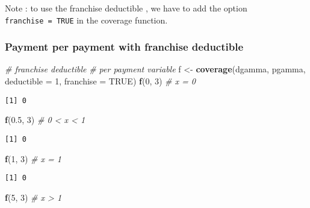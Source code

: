 \documentclass[]{book}
\newenvironment{Shaded}{\begin{snugshade}}{\end{snugshade}}
\newcommand{\KeywordTok}[1]{\textcolor[rgb]{0.13,0.29,0.53}{\textbf{#1}}}
\newcommand{\DataTypeTok}[1]{\textcolor[rgb]{0.13,0.29,0.53}{#1}}
\newcommand{\DecValTok}[1]{\textcolor[rgb]{0.00,0.00,0.81}{#1}}
\newcommand{\FloatTok}[1]{\textcolor[rgb]{0.00,0.00,0.81}{#1}}
\newcommand{\StringTok}[1]{\textcolor[rgb]{0.31,0.60,0.02}{#1}}
\newcommand{\CommentTok}[1]{\textcolor[rgb]{0.56,0.35,0.01}{\textit{#1}}}
\newcommand{\OtherTok}[1]{\textcolor[rgb]{0.56,0.35,0.01}{#1}}
\newcommand{\NormalTok}[1]{#1}
\theoremstyle{definition}
\theoremstyle{definition}
\theoremstyle{definition}
\theoremstyle{remark}
\begin{document}
Note : to use the franchise deductible , we have to add the option
\texttt{franchise\ =\ TRUE} in the coverage function.

\subsubsection{Payment per payment with franchise
deductible}\label{payment-per-payment-with-franchise-deductible}

\begin{Shaded}
\begin{Highlighting}[]
\CommentTok{# franchise deductible}
\CommentTok{# per payment variable}
\NormalTok{f <-}\StringTok{ }\KeywordTok{coverage}\NormalTok{(dgamma, pgamma, }\DataTypeTok{deductible =} \DecValTok{1}\NormalTok{, }\DataTypeTok{franchise =} \OtherTok{TRUE}\NormalTok{)}
\KeywordTok{f}\NormalTok{(}\DecValTok{0}\NormalTok{, }\DecValTok{3}\NormalTok{)   }\CommentTok{# x = 0}
\end{Highlighting}
\end{Shaded}

\begin{verbatim}
[1] 0
\end{verbatim}

\begin{Shaded}
\begin{Highlighting}[]
\KeywordTok{f}\NormalTok{(}\FloatTok{0.5}\NormalTok{, }\DecValTok{3}\NormalTok{) }\CommentTok{# 0 < x < 1}
\end{Highlighting}
\end{Shaded}

\begin{verbatim}
[1] 0
\end{verbatim}

\begin{Shaded}
\begin{Highlighting}[]
\KeywordTok{f}\NormalTok{(}\DecValTok{1}\NormalTok{, }\DecValTok{3}\NormalTok{) }\CommentTok{# x = 1}
\end{Highlighting}
\end{Shaded}

\begin{verbatim}
[1] 0
\end{verbatim}

\begin{Shaded}
\begin{Highlighting}[]
\KeywordTok{f}\NormalTok{(}\DecValTok{5}\NormalTok{, }\DecValTok{3}\NormalTok{) }\CommentTok{# x > 1}
\end{Highlighting}
\end{Shaded}
\end{document}
